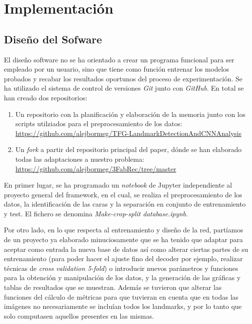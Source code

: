 \chapter{Implementación}

\section{Diseño del Sofware}

\noindent El diseño software no se ha orientado a crear un programa funcional para ser empleado por un usuario, sino que tiene como función entrenar los modelos probados y recabar los resultados oportunos del proceso de experimentación. Se ha utilizado el sistema de control de versiones \textit{Git} junto con \textit{GitHub}. En total se han creado dos repositorios:

\begin{enumerate}
    \item Un repositorio con la planificación y elaboración de la memoria junto con los scripts utilziados para el preprocesamiento de los datos: \url{https://github.com/alejbormeg/TFG-LandmarkDetectionAndCNNAnalysis}
    \item Un \textit{fork} a partir del repositorio principal del paper, dónde se han elaborado todas las adaptaciones a nuestro problema: \url{https://github.com/alejbormeg/3FabRec/tree/master}
\end{enumerate}

\medskip

\noindent En primer lugar, se ha programado un \textit{notebook} de Jupyter independiente al proyecto general del framework, en el cual, se realiza el preprocesamiento de los datos, la identificación de las caras y la separación en conjunto de entrenamiento y test. El fichero se denomina \textit{Make-crop-split database.ipynb}.

\medskip

\noindent Por otro lado, en lo que respecta al entrenamiento y diseño de la red, partíamos de un proyecto ya elaborado minuciosamente que se ha tenido que adaptar para aceptar como entrada la nueva base de datos así como alterar ciertas partes de su entrenamiento (para poder hacer el ajuste fino del decoder por ejemplo, realizar técnicas de \textit{cross validation 5-fold}) o introducir nuevos parámetros y funciones para la obtención y manipulación de los datos, y la generación de las gráficas y tablas de resultados que se muestran. Además se tuvieron que alterar las funciones del cálculo de métricas para que tuvieran en cuenta que en todas las imágenes no necesariamente se incluían todos los landmarks, y por lo tanto que solo computasen aquellos presentes en las mismas.

